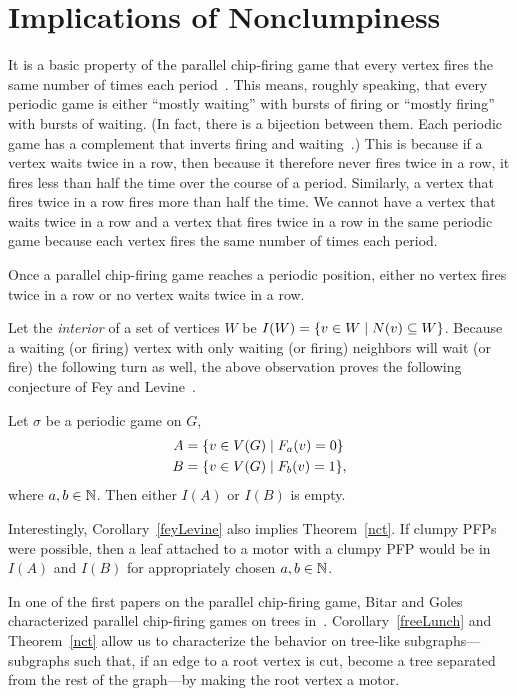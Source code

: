 \section{Implications of Nonclumpiness} \label{corollaries}
It is a basic property of the parallel chip-firing game that every vertex fires
the same number of times each period~\cite{jiang}. This means, roughly
speaking, that every periodic game is either ``mostly waiting'' with bursts of
firing or ``mostly firing'' with bursts of waiting. (In fact, there is a
bijection between them. Each periodic game has a complement that inverts firing
and waiting~\cite{jiang}.) This is because if a vertex waits twice in a row,
then because it therefore never fires twice in a row, it fires less than half
the time over the course of a period. Similarly, a vertex that fires twice in a
row fires more than half the time. We cannot have a vertex that waits twice
in a row and a vertex that fires twice in a row in the same periodic game
because each vertex fires the same number of times each period.

\begin{cor}
Once a parallel chip-firing game reaches a periodic position, either no vertex
fires twice in a row or no vertex waits twice in a row.
\end{cor}

Let the \emph{interior} of a set of vertices $W$ be $I(W) = \set{v \in W}{N(v)
  \subseteq W}$. Because a waiting (or firing) vertex with only waiting (or
firing) neighbors will wait (or fire) the following turn as well, the above
observation proves the following conjecture of Fey and
Levine~\cite{privateComms}.

\begin{cor}\label{feyLevine}
Let $\sigma$ be a periodic game on $G$,
\begin{align*}
  A &= \set{v \in \V}{\firing{v}{a} = 0} \\
  B &= \set{v \in \V}{\firing{v}{b} = 1},
\end{align*}
where $a,b \in \mathbb{N}$. Then either $I(A)$ or $I(B)$ is empty.
\end{cor}

Interestingly, Corollary~\ref{feyLevine} also implies Theorem~\ref{nct}. If
clumpy PFPs were possible, then a leaf attached to a motor with a clumpy PFP
would be in $I(A)$ and $I(B)$ for appropriately chosen $a,b \in \mathbb{N}$.

In one of the first papers on the parallel chip-firing game, Bitar and Goles
characterized parallel chip-firing games on trees in~\cite{bitarGoles}.
Corollary~\ref{freeLunch} and Theorem~\ref{nct} allow us to characterize the
behavior on tree-like subgraphs---subgraphs such that, if an edge to a root
vertex is cut, become a tree separated from the rest of the graph---by making
the root vertex a motor.

